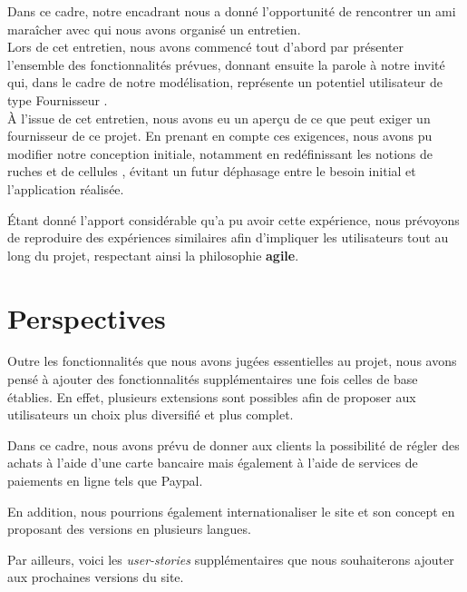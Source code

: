 \documentclass[a4paper,12pt]{report}
\theoremstyle{break}
\theoremstyle{break}
\theoremstyle{break}
\theoremstyle{break}
\theoremstyle{definition}
\theoremstyle{remark}
\begin{document}
Dans ce cadre, notre encadrant nous a donné l'opportunité de rencontrer un ami maraîcher avec qui nous avons organisé un entretien.\\
Lors de cet entretien, nous avons commencé tout d'abord par présenter l'ensemble des fonctionnalités prévues, donnant ensuite la parole à notre invité qui, dans le cadre de notre modélisation, représente un potentiel utilisateur de type \og Fournisseur \fg.\\
À l'issue de cet entretien, nous avons eu un aperçu de ce que peut exiger un fournisseur de ce projet.
En prenant en compte ces exigences, nous avons pu modifier notre conception initiale, notamment en redéfinissant les notions de \og ruches \fg et de \og cellules \fg, évitant un futur déphasage entre le besoin initial et l'application réalisée.

Étant donné l'apport considérable qu'a pu avoir cette expérience, nous prévoyons de reproduire des expériences similaires afin d'impliquer les utilisateurs tout au long du projet, respectant ainsi la philosophie \textbf{agile}.
\section{Perspectives}
\label{sec:perspectives}
Outre les fonctionnalités que nous avons jugées essentielles au projet, nous avons pensé à ajouter des fonctionnalités supplémentaires une fois celles de base établies. En effet, plusieurs extensions sont possibles afin de proposer aux utilisateurs un choix plus diversifié et plus complet.

Dans ce cadre, nous avons prévu de donner aux clients la possibilité de régler des achats à l'aide d'une carte bancaire mais également à l'aide de services de paiements en ligne tels que Paypal.

En addition, nous pourrions également internationaliser le site et son concept en proposant des versions en plusieurs langues.

Par ailleurs, voici les \textit{user-stories} supplémentaires que nous souhaiterons ajouter aux prochaines versions du site.
\end{document}
